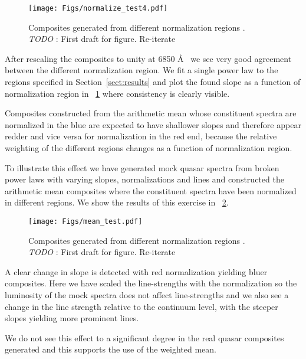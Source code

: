 \documentclass{aa}    %
\newcommand{\figref}[1]{\ref{fig:#1}}
\newcommand{\Fig}[1]{\figurename~\figref{#1}}
\newcommand{\fig}[1]{\Fig{#1}}
\newcommand{\figlabel}[1]{\label{fig:#1}}
\newcommand{\sectionname}{Section}
\newcommand{\Sect}[1]{\sectionname~\ref{sect:#1}}
\newcommand{\sect}[1]{\Sect{#1}}
\newcommand{\todo}[3]{{\color{#2}\emph{#1}: #3}}
\newcommand{\jstodo}[1]{\todo{ \\TODO }{green}{#1}}
\begin{document}
 \begin{figure}[hbtp]
   \centering
   \texttt{[image: Figs/normalize\_test4.pdf]}
   \caption[]{Composites generated from different normalization regions . \jstodo{First draft for figure. Re-iterate}}
  \figlabel{norm_test}
 \end{figure}


After rescaling the composites to unity at 6850 \AA~ we see very good agreement between the different normalization region. We fit a single power law to the regions specified in \sect{results} and plot the found slope as a function of normalization region in \fig{norm_test} where consistency is clearly visible. 

Composites constructed from the arithmetic mean whose constituent spectra are normalized in the blue are expected to have shallower slopes and therefore appear redder and vice versa for normalization in the red end, because the relative weighting of the different regions changes as a function of normalization region. 

To illustrate this effect we have generated mock quasar spectra from broken power laws with varying slopes, normalizations and lines and constructed the arithmetic mean composites where the constituent spectra have been normalized in different regions. We show the results of this exercise in \fig{mean_test}.


 \begin{figure}[hbtp]
   \centering
   \texttt{[image: Figs/mean\_test.pdf]}
   \caption[]{Composites generated from different normalization regions . \jstodo{First draft for figure. Re-iterate}}
  \figlabel{mean_test}
 \end{figure}


 A clear change in slope is detected with red normalization yielding bluer composites. Here we have scaled the line-strengths with the normalization so the luminosity of the mock spectra does not affect line-strengths and we also see a change in the line strength relative to the continuum level, with the steeper slopes yielding more prominent lines.
 
We do not see this effect to a significant degree in the real quasar composites generated and this supports the use of the weighted mean.
\end{document}
